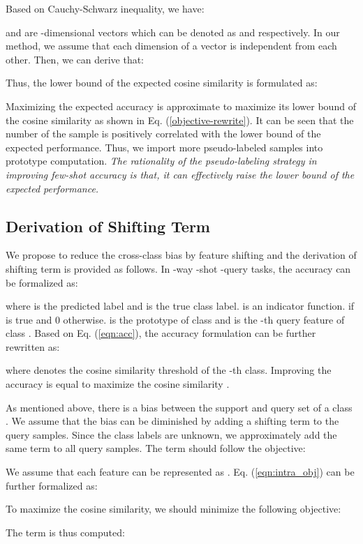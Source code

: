 \documentclass[runningheads]{llncs}
\begin{document}
Based on Cauchy-Schwarz inequality, we have: 

 and  are -dimensional vectors which can be denoted as  and  respectively. In our method, we assume that each dimension of a vector is independent from each other. Then, we can derive that:

Thus, the lower bound of the expected cosine similarity is formulated as:


Maximizing the expected accuracy is approximate to maximize its lower bound of the cosine similarity as shown in Eq. (\ref{objective-rewrite}). It can be seen that the number  of the sample is positively correlated with the lower bound of the expected performance. Thus, we import more pseudo-labeled samples into prototype computation. \textit{The rationality of the pseudo-labeling strategy in improving few-shot accuracy is that, it can effectively raise the lower bound of the expected performance.}


\subsection{Derivation of Shifting Term }
We propose to reduce the cross-class bias by feature shifting and the derivation of shifting term  is provided as follows. 
In -way -shot -query tasks, the accuracy can be formalized as:

where  is the predicted label and  is the true class label.
 is an indicator function.  if  is true and 0 otherwise.  is the prototype of class  and  is the -th query feature of class .
Based on Eq. (\ref{eqn:acc}), the accuracy formulation can be further rewritten as:

where  denotes the cosine similarity threshold of the -th class. Improving the accuracy is equal to maximize the cosine similarity .


As mentioned above, there is a bias between the support and query set of a class . We assume that the bias can be diminished by adding a shifting term  to the query samples. Since the class labels are unknown, we approximately add the same term  to all query samples. The term  should follow the objective: 


 
We assume that each feature  can be represented as . Eq. (\ref{eqn:intra_obj}) can be further formalized as:

To maximize the cosine similarity, we should minimize the following objective:

The term  is thus computed:
\end{document}
